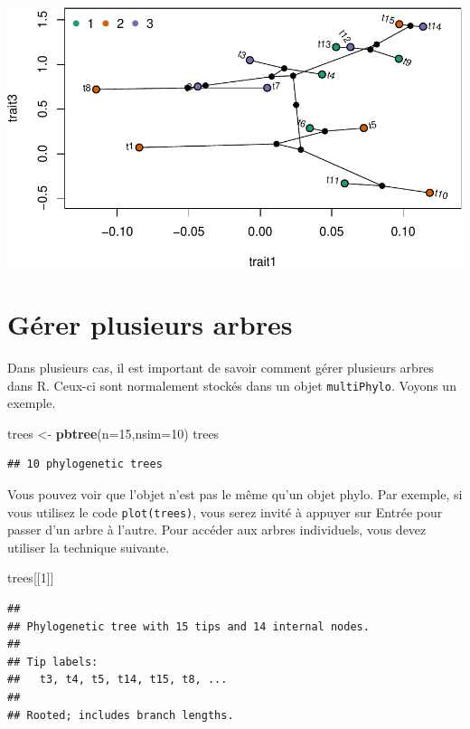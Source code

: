 \documentclass[
]{book}
\newenvironment{Shaded}{\begin{snugshade}}{\end{snugshade}}
\newcommand{\AttributeTok}[1]{\textcolor[rgb]{0.13,0.29,0.53}{#1}}
\newcommand{\DecValTok}[1]{\textcolor[rgb]{0.00,0.00,0.81}{#1}}
\newcommand{\FunctionTok}[1]{\textcolor[rgb]{0.13,0.29,0.53}{\textbf{#1}}}
\newcommand{\NormalTok}[1]{#1}
\newcommand{\OtherTok}[1]{\textcolor[rgb]{0.56,0.35,0.01}{#1}}
\begin{document}
\includegraphics{pcm-workshop_files/figure-latex/Phylomorphospace-1.pdf}

\section{Gérer plusieurs arbres}\label{guxe9rer-plusieurs-arbres}

Dans plusieurs cas, il est important de savoir comment gérer plusieurs arbres dans R. Ceux-ci sont normalement stockés dans un objet \texttt{multiPhylo}. Voyons un exemple.

\begin{Shaded}
\begin{Highlighting}[]
\NormalTok{trees }\OtherTok{\textless{}{-}} \FunctionTok{pbtree}\NormalTok{(}\AttributeTok{n=}\DecValTok{15}\NormalTok{,}\AttributeTok{nsim=}\DecValTok{10}\NormalTok{)}
\NormalTok{trees}
\end{Highlighting}
\end{Shaded}

\begin{verbatim}
## 10 phylogenetic trees
\end{verbatim}

Vous pouvez voir que l'objet n'est pas le même qu'un objet phylo. Par exemple, si vous utilisez le code \texttt{plot(trees)}, vous serez invité à appuyer sur Entrée pour passer d'un arbre à l'autre. Pour accéder aux arbres individuels, vous devez utiliser la technique suivante.

\begin{Shaded}
\begin{Highlighting}[]
\NormalTok{trees[[}\DecValTok{1}\NormalTok{]]}
\end{Highlighting}
\end{Shaded}

\begin{verbatim}
## 
## Phylogenetic tree with 15 tips and 14 internal nodes.
## 
## Tip labels:
##   t3, t4, t5, t14, t15, t8, ...
## 
## Rooted; includes branch lengths.
\end{verbatim}
\end{document}
